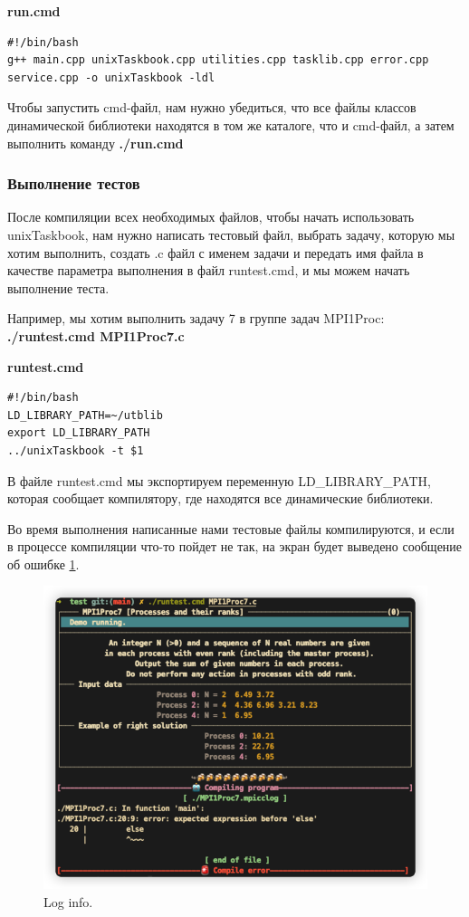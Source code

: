 \centerline{\textbf{run.cmd}}

\lstset{language=bash}
\begin{lstlisting}
#!/bin/bash
g++ main.cpp unixTaskbook.cpp utilities.cpp tasklib.cpp error.cpp service.cpp -o unixTaskbook -ldl
\end{lstlisting}

Чтобы запустить cmd-файл, нам нужно убедиться, что все файлы классов динамической 
библиотеки находятся в том же каталоге, что и cmd-файл, а затем выполнить команду \textbf{./run.cmd}

\subsubsection{Выполнение тестов}

После компиляции всех необходимых файлов, чтобы начать использовать unixTaskbook, нам 
нужно написать тестовый файл, выбрать задачу, которую мы хотим выполнить, создать .c файл 
с именем задачи и передать имя файла в качестве параметра выполнения в файл runtest.cmd, и 
мы можем начать выполнение теста.

Например, мы хотим выполнить задачу 7 в группе задач MPI1Proc: 
\\ \textbf{./runtest.cmd MPI1Proc7.c}

\centerline{\textbf{runtest.cmd}}

\lstset{language=bash}
\begin{lstlisting}
#!/bin/bash
LD_LIBRARY_PATH=~/utblib
export LD_LIBRARY_PATH
../unixTaskbook -t $1
\end{lstlisting}

В файле runtest.cmd мы экспортируем переменную LD\_LIBRARY\_PATH, 
которая сообщает компилятору, где находятся все динамические библиотеки.

Во время выполнения написанные нами тестовые файлы компилируются, и если в процессе компиляции что-то пойдет не так, на экран будет выведено сообщение об ошибке \ref{error}.
\begin{figure}[htbp]%
    \centering
    \includegraphics[width=1\linewidth]{images/error.jpg}%
    \caption{Log info.}%
    \label{error}%
\end{figure}


